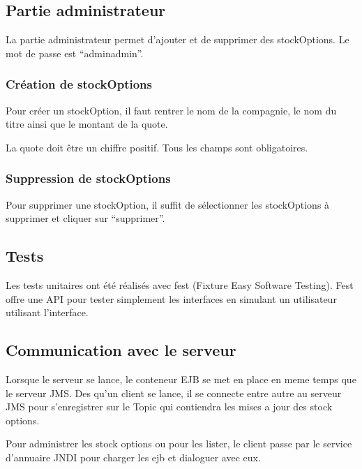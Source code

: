 \subsection{Partie administrateur}
La partie administrateur permet d'ajouter et de supprimer des stockOptions. Le mot de passe est ``adminadmin''.
\subsubsection{Création de stockOptions}
Pour créer un stockOption, il faut rentrer le nom de la compagnie, le nom du titre ainsi que le montant de la quote.

La quote doit être un chiffre positif. Tous les champs sont obligatoires.
\subsubsection{Suppression de stockOptions}
Pour supprimer une stockOption, il suffit de sélectionner les stockOptions à supprimer et cliquer sur ``supprimer''.
\subsection{Tests}
Les tests unitaires ont été réalisés avec fest (Fixture Easy Software Testing). Fest offre une API pour tester simplement les interfaces en simulant un utilisateur utilisant l'interface.

\subsection{Communication avec le serveur}
Lorsque le serveur se lance, le conteneur EJB se met en place en meme temps que le serveur JMS. Des qu'un client se lance, il se connecte entre autre au serveur JMS pour s'enregistrer sur le Topic qui contiendra les mises a jour des stock options.

Pour administrer les stock options ou pour les lister, le client passe par le service d'annuaire JNDI pour charger les ejb et dialoguer avec eux.
